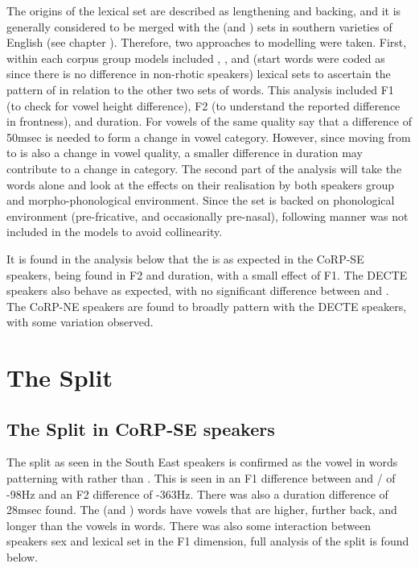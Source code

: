 \documentclass[../../00.FullDoc/tex/Thesis]{subfiles}
\begin{document}
The origins of the \bath{} lexical set are described as lengthening and backing, and it is generally considered to be merged with the \palm{} (and ) sets in southern varieties of English (see chapter \notinsubfile{\ref{ch:LitReviewSocio}}). Therefore, two approaches to modelling were taken. First, within each corpus group models included \trap{}, \bath{}, and \palm{} (start words were coded as \palm{} since there is no difference in non-rhotic speakers) lexical sets to ascertain the pattern of \bath{} in relation to the other two sets of words. This analysis included F1 (to check for vowel height difference), F2 (to understand the reported difference in frontness), and duration. For vowels of the same quality \citet{Labov2006c} say that a difference of 50msec is needed to form a change in vowel category. However, since \bath{} moving from \trap{} to \palm{} is also a change in vowel quality, a smaller difference in duration may contribute to a change in category. The second part of the analysis will take the \bath{} words alone and look at the effects on their realisation by both speakers group and morpho-phonological environment. Since the \bath{} set is backed on phonological environment (pre-fricative, and occasionally pre-nasal), following manner was not included in the models to avoid collinearity.

It is found in the analysis below that the \TB{} is as expected in the CoRP-SE speakers, being found in F2 and duration, with a small effect of F1. The DECTE speakers also behave as expected, with no significant difference between \trap{} and \bath{}. The CoRP-NE speakers are found to broadly pattern with the DECTE speakers, with some variation observed.

	
\section{The Split} \label{sec:TBSplit}
\subsection{The Split in CoRP-SE speakers}
The \TB{} split as seen in the South East speakers is confirmed as the vowel in \bath{} words patterning with \palm{} rather than \trap{}. This is seen in an F1 difference between \trap{} and \bath{}/\palm{} of -98Hz and an F2 difference of -363Hz. There was also a duration difference of 28msec found. The \bath{} (and \palm{}) words have vowels that are higher, further back, and longer than the vowels in \trap{} words. There was also some interaction between speakers sex and lexical set in the F1 dimension, full analysis of the split is found below.
\end{document}
